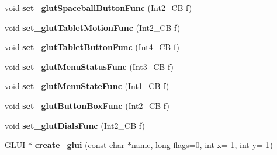 \begin{DoxyCompactItemize}
\item 
\hypertarget{class_g_l_u_i___master___object_a47961d2385bfbbb58c5cc2aac24473b0}{void {\bfseries set\+\_\+glut\+Spaceball\+Button\+Func} (Int2\+\_\+\+C\+B f)}\label{class_g_l_u_i___master___object_a47961d2385bfbbb58c5cc2aac24473b0}

\item 
\hypertarget{class_g_l_u_i___master___object_aa0f01144f1894acdebffce2c0c3d1a93}{void {\bfseries set\+\_\+glut\+Tablet\+Motion\+Func} (Int2\+\_\+\+C\+B f)}\label{class_g_l_u_i___master___object_aa0f01144f1894acdebffce2c0c3d1a93}

\item 
\hypertarget{class_g_l_u_i___master___object_a449c4ac3bd2edfb6854b90543b6633de}{void {\bfseries set\+\_\+glut\+Tablet\+Button\+Func} (Int4\+\_\+\+C\+B f)}\label{class_g_l_u_i___master___object_a449c4ac3bd2edfb6854b90543b6633de}

\item 
\hypertarget{class_g_l_u_i___master___object_af230d62a22c0016cf740977553c42c33}{void {\bfseries set\+\_\+glut\+Menu\+Status\+Func} (Int3\+\_\+\+C\+B f)}\label{class_g_l_u_i___master___object_af230d62a22c0016cf740977553c42c33}

\item 
\hypertarget{class_g_l_u_i___master___object_a191c14ba9994bf9ca365c5da06286c59}{void {\bfseries set\+\_\+glut\+Menu\+State\+Func} (Int1\+\_\+\+C\+B f)}\label{class_g_l_u_i___master___object_a191c14ba9994bf9ca365c5da06286c59}

\item 
\hypertarget{class_g_l_u_i___master___object_a02d788570f74d1997075c2ad536154ac}{void {\bfseries set\+\_\+glut\+Button\+Box\+Func} (Int2\+\_\+\+C\+B f)}\label{class_g_l_u_i___master___object_a02d788570f74d1997075c2ad536154ac}

\item 
\hypertarget{class_g_l_u_i___master___object_a8b6d9eed9feec3c8e138ebfe2c1b93e5}{void {\bfseries set\+\_\+glut\+Dials\+Func} (Int2\+\_\+\+C\+B f)}\label{class_g_l_u_i___master___object_a8b6d9eed9feec3c8e138ebfe2c1b93e5}

\item 
\hypertarget{class_g_l_u_i___master___object_aab5db5ba1b2a590be1415c00e2a9d644}{\hyperlink{class_g_l_u_i}{G\+L\+U\+I} $\ast$ {\bfseries create\+\_\+glui} (const char $\ast$name, long flags=0, int x=-\/1, int \hyperlink{_ice_utils_8h_aa7ffaed69623192258fb8679569ff9ba}{y}=-\/1)}\label{class_g_l_u_i___master___object_aab5db5ba1b2a590be1415c00e2a9d644}


\end{DoxyCompactItemize}
